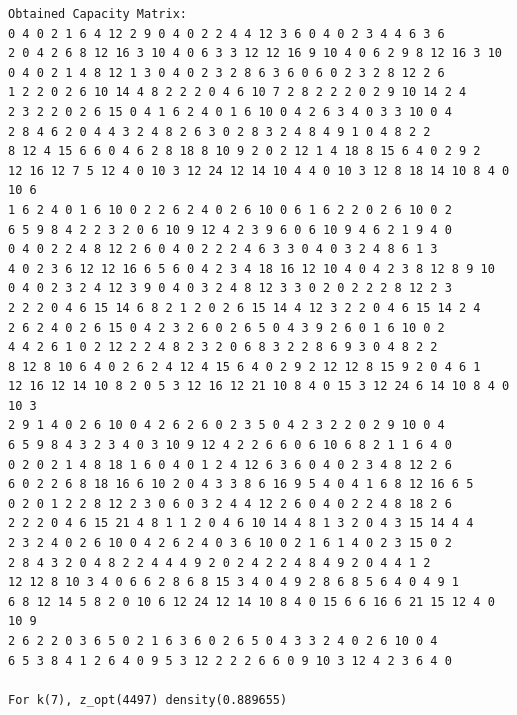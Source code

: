 \documentclass[11pt]{article}
\begin{document}
\begin{lstlisting}
Obtained Capacity Matrix:
0 4 0 2 1 6 4 12 2 9 0 4 0 2 2 4 4 12 3 6 0 4 0 2 3 4 4 6 3 6
2 0 4 2 6 8 12 16 3 10 4 0 6 3 3 12 12 16 9 10 4 0 6 2 9 8 12 16 3 10
0 4 0 2 1 4 8 12 1 3 0 4 0 2 3 2 8 6 3 6 0 6 0 2 3 2 8 12 2 6
1 2 2 0 2 6 10 14 4 8 2 2 2 0 4 6 10 7 2 8 2 2 2 0 2 9 10 14 2 4
2 3 2 2 0 2 6 15 0 4 1 6 2 4 0 1 6 10 0 4 2 6 3 4 0 3 3 10 0 4
2 8 4 6 2 0 4 4 3 2 4 8 2 6 3 0 2 8 3 2 4 8 4 9 1 0 4 8 2 2
8 12 4 15 6 6 0 4 6 2 8 18 8 10 9 2 0 2 12 1 4 18 8 15 6 4 0 2 9 2
12 16 12 7 5 12 4 0 10 3 12 24 12 14 10 4 4 0 10 3 12 8 18 14 10 8 4 0 10 6
1 6 2 4 0 1 6 10 0 2 2 6 2 4 0 2 6 10 0 6 1 6 2 2 0 2 6 10 0 2
6 5 9 8 4 2 2 3 2 0 6 10 9 12 4 2 3 9 6 0 6 10 9 4 6 2 1 9 4 0
0 4 0 2 2 4 8 12 2 6 0 4 0 2 2 2 4 6 3 3 0 4 0 3 2 4 8 6 1 3
4 0 2 3 6 12 12 16 6 5 6 0 4 2 3 4 18 16 12 10 4 0 4 2 3 8 12 8 9 10
0 4 0 2 3 2 4 12 3 9 0 4 0 3 2 4 8 12 3 3 0 2 0 2 2 2 8 12 2 3
2 2 2 0 4 6 15 14 6 8 2 1 2 0 2 6 15 14 4 12 3 2 2 0 4 6 15 14 2 4
2 6 2 4 0 2 6 15 0 4 2 3 2 6 0 2 6 5 0 4 3 9 2 6 0 1 6 10 0 2
4 4 2 6 1 0 2 12 2 2 4 8 2 3 2 0 6 8 3 2 2 8 6 9 3 0 4 8 2 2
8 12 8 10 6 4 0 2 6 2 4 12 4 15 6 4 0 2 9 2 12 12 8 15 9 2 0 4 6 1
12 16 12 14 10 8 2 0 5 3 12 16 12 21 10 8 4 0 15 3 12 24 6 14 10 8 4 0 10 3
2 9 1 4 0 2 6 10 0 4 2 6 2 6 0 2 3 5 0 4 2 3 2 2 0 2 9 10 0 4
6 5 9 8 4 3 2 3 4 0 3 10 9 12 4 2 2 6 6 0 6 10 6 8 2 1 1 6 4 0
0 2 0 2 1 4 8 18 1 6 0 4 0 1 2 4 12 6 3 6 0 4 0 2 3 4 8 12 2 6
6 0 2 2 6 8 18 16 6 10 2 0 4 3 3 8 6 16 9 5 4 0 4 1 6 8 12 16 6 5
0 2 0 1 2 2 8 12 2 3 0 6 0 3 2 4 4 12 2 6 0 4 0 2 2 4 8 18 2 6
2 2 2 0 4 6 15 21 4 8 1 1 2 0 4 6 10 14 4 8 1 3 2 0 4 3 15 14 4 4
2 3 2 4 0 2 6 10 0 4 2 6 2 4 0 3 6 10 0 2 1 6 1 4 0 2 3 15 0 2
2 8 4 3 2 0 4 8 2 2 4 4 4 9 2 0 2 4 2 2 4 8 4 9 2 0 4 4 1 2
12 12 8 10 3 4 0 6 6 2 8 6 8 15 3 4 0 4 9 2 8 6 8 5 6 4 0 4 9 1
6 8 12 14 5 8 2 0 10 6 12 24 12 14 10 8 4 0 15 6 6 16 6 21 15 12 4 0 10 9
2 6 2 2 0 3 6 5 0 2 1 6 3 6 0 2 6 5 0 4 3 3 2 4 0 2 6 10 0 4
6 5 3 8 4 1 2 6 4 0 9 5 3 12 2 2 2 6 6 0 9 10 3 12 4 2 3 6 4 0

For k(7), z_opt(4497) density(0.889655)


\end{lstlisting}
\end{document}
